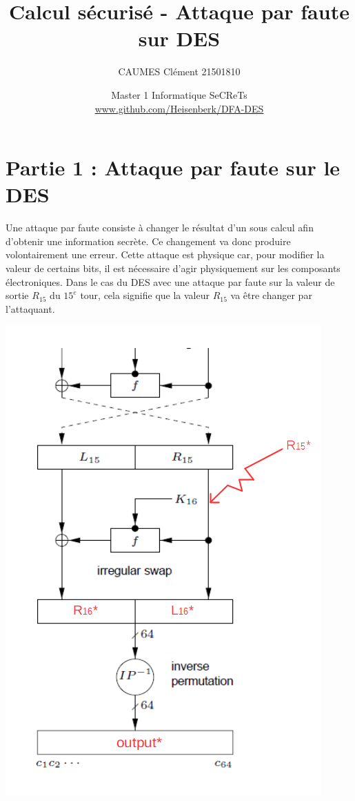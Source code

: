\documentclass[11pt]{article}
\title{\huge{\textbf Calcul sécurisé - Attaque par faute sur DES}}
\author{CAUMES Clément 21501810}
\date{Master 1 Informatique SeCReTs \\ \url{www.github.com/Heisenberk/DFA-DES}}
\begin{document}
\maketitle
\vspace{20em}
\newpage

\tableofcontents
\newpage

\section{Partie 1 : Attaque par faute sur le DES}

Une attaque par faute consiste à changer le résultat d'un sous calcul afin d'obtenir une information secrète. Ce changement va donc produire volontairement une erreur. Cette attaque est physique car, pour modifier la valeur de certains bits, il est nécessaire d'agir physiquement sur les composants électroniques. 
Dans le cas du DES avec une attaque par faute sur la valeur de sortie $R_{15}$ du $15^{e}$ tour, cela signifie que la valeur $R_{15}$ va être changer par l'attaquant. 

\begin{center}\includegraphics[scale=0.6]{../pictures/fauteR15.png}\end{center}
\end{document}
